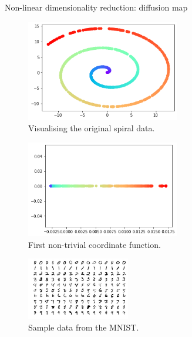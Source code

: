 \documentclass[xcolor={dvipsnames,svgnames}]{beamer}
\begin{document}
\begin{frame}{Non-linear dimensionality reduction: diffusion map}

    \begin{minipage}[t]{.45\linewidth}  
    \begin{figure}
            \includegraphics[width=0.6\textwidth]{spiral.png}
            \caption{Visualising the original spiral data.}
        \end{figure} 
      \begin{figure}         \includegraphics[width=0.6\textwidth]{spiral-unroll.png}
            \caption{First non-trivial coordinate function.}
            \end{figure} 
    \end{minipage}
    \hfill
      \begin{minipage}[t]{.45\linewidth}   
    \begin{figure}
            \includegraphics[width=0.4\textwidth]{mnist-vis.png}
            \caption{Sample data from the MNIST.}
        \end{figure} 

\end{minipage}
\end{frame}
\end{document}
